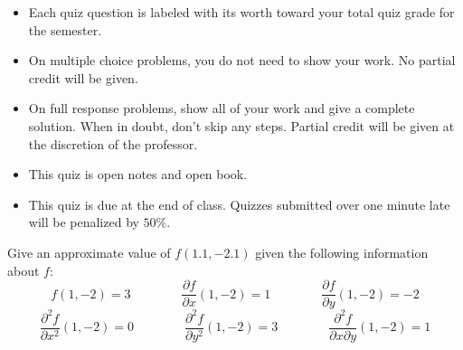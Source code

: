 \documentclass[12pt]{exam}
\newcommand{\<}{(}
\renewcommand{\>}{)}
\newcommand{\p}{\partial}
\begin{document}
\begin{center}
\end{center}
\vspace{0.1in}

\vspace{12pt}

\begin{itemize}
  \item Each quiz question is labeled with its worth toward your total quiz
        grade for the semester.
  \item On multiple choice problems, you do not need to show your work. No
        partial credit will be given.
  \item On full response problems, show all of your work and give a
        complete solution. When in doubt, don't skip any steps. Partial
        credit will be given at the discretion of the professor.
  \item This quiz is open notes and open book.
  \item This quiz is due at the end of class. Quizzes submitted over one minute
        late will be penalized by \(50\%\).
\end{itemize}

\newpage

\begin{questions}

\question[10]
Give an approximate value of \(f(1.1,-2.1)\) given the following
information about \(f\):
\[
  f(1,-2)=3
    \hspace{4em}
  \frac{\p f}{\p x}(1,-2)=1
    \hspace{4em}
  \frac{\p f}{\p y}(1,-2)=-2
\]
\[
  \frac{\p^2 f}{\p x^2}(1,-2)=0
    \hspace{4em}
  \frac{\p^2 f}{\p y^2}(1,-2)=3
    \hspace{4em}
  \frac{\p^2 f}{\p x\p y}(1,-2)=1
\]


\vfill
\end{questions}
\end{document}
